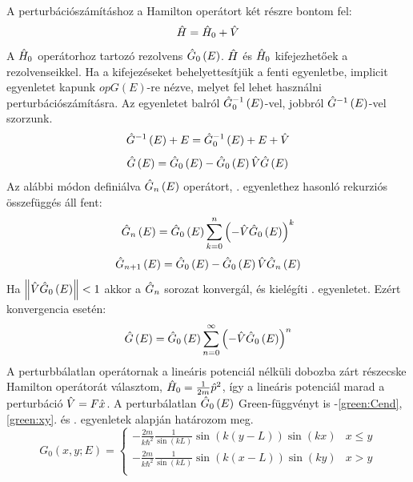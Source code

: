 A perturbációszámításhoz a Hamilton operátort két részre bontom fel:
\begin{equation}
	\hat{H} = \hat{H}_0 + \hat{V}
\end{equation}
A $\hat{H}_0$ operátorhoz tartozó rezolvens $\hat{G}_0\left(E\right)$. $\hat{H}$ és $\hat{H}_0$ kifejezhetőek a rezolvenseikkel. Ha a kifejezéseket behelyettesítjük a fenti egyenletbe, implicit egyenletet kapunk $op{G}\left(E\right)$-re nézve, melyet fel lehet használni perturbációszámításra. Az egyenletet balról $\hat{G}_0^{-1}\left(E\right)$-vel, jobbról $\hat{G}^{-1}\left(E\right)$-vel szorzunk.
\begin{equation}
	\hat{G}^{-1}\left(E\right) + E = \hat{G}_0^{-1}\left(E\right) + E + \hat{V}
\end{equation}
\begin{equation}
	\hat{G}\left(E\right) = \hat{G}_0\left(E\right) - \hat{G}_0\left(E\right)\hat{V}\hat{G}\left(E\right)
	\label{green:pertmaster}
\end{equation}
Az alábbi módon definiálva $\hat{G}_n\left(E\right)$ operátort, . egyenlethez hasonló rekurziós összefüggés áll fent:
\begin{equation}
	\hat{G}_n\left(E\right) = \hat{G}_0\left(E\right)\sum_{k=0}^n\left(-\hat{V}\hat{G}_0\left(E\right)\right)^k
\end{equation}
\begin{equation}
	\hat{G}_{n+1}\left(E\right) = \hat{G}_0\left(E\right) - \hat{G}_0\left(E\right)\hat{V}\hat{G}_n\left(E\right)
\end{equation}
Ha $\left\lVert \hat{V}\hat{G}_0\left(E\right) \right\rVert < 1$ akkor a $\hat{G}_n$ sorozat konvergál, és kielégíti . egyenletet. Ezért konvergencia esetén:
\begin{equation}
	\hat{G}\left(E\right) = \hat{G}_0\left(E\right)\sum_{n=0}^\infty\left(-\hat{V}\hat{G}_0\left(E\right)\right)^n
\end{equation}
A perturbbálatlan operátornak a lineáris potenciál nélküli dobozba zárt részecske Hamilton operátorát választom, $\hat{H}_0=\frac{1}{2m}\hat{p}^2$, így a lineáris potenciál marad a perturbáció $\hat{V} = F\hat{x}$. A perturbálatlan $\hat{G}_0\left(E\right)$ Green-függvényt is -\ref{green:Cend}, \ref{green:xy}. és . egyenletek alapján határozom meg.
\begin{equation}
	G_0\left(x,y;E\right) =
	\begin{cases}
		-\frac{2m}{k\hbar^2}\frac{1}{\sin\left(kL\right)} \sin\left(k\left(y-L\right)\right)\sin\left(kx\right) & x\leq y\\
		-\frac{2m}{k\hbar^2}\frac{1}{\sin\left(kL\right)} \sin\left(k\left(x-L\right)\right)\sin\left(ky\right) & x>y\\
	\end{cases}
\end{equation}
